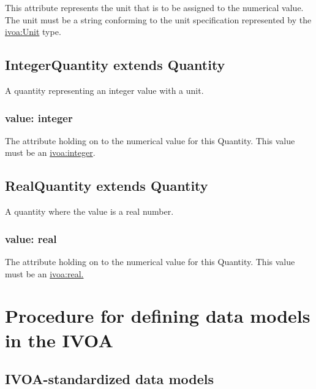\documentclass[10pt,a4paper]{ivoa}
\begin{document}
This attribute represents the unit that is to be assigned to the
numerical value. The unit must be a string conforming to the unit
specification represented by the
\protect\hyperlink{unit-extends-string}{ivoa:Unit} type.

\hypertarget{integerquantity-extends-quantity}{%
\subsection{IntegerQuantity extends
Quantity}\label{integerquantity-extends-quantity}}

A quantity representing an integer value with a unit.

\hypertarget{value-integer}{%
\subsubsection{\texorpdfstring{ value:
integer}{ value: integer}}\label{value-integer}}

The attribute holding on to the numerical value for this Quantity. This
value must be an \protect\hyperlink{integer}{ivoa:integer}.

\hypertarget{realquantity-extends-quantity}{%
\subsection{RealQuantity extends
Quantity}\label{realquantity-extends-quantity}}

A quantity where the value is a real number.

\hypertarget{value-real}{%
\subsubsection{value: real}\label{value-real}}

The attribute holding on to the numerical value for this Quantity. This
value must be an \protect\hyperlink{real}{ivoa:real.}

\hypertarget{procedure-for-defining-data-models-in-the-ivoa}{%
\section{Procedure for defining data models in the
IVOA}\label{procedure-for-defining-data-models-in-the-ivoa}}

\hypertarget{ivoa-standardized-data-models}{%
\subsection{IVOA-standardized data
models}\label{ivoa-standardized-data-models}}
\end{document}
